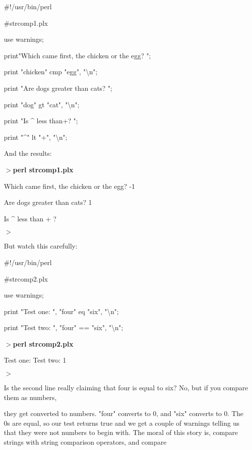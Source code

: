\documentclass[a4paper,11pt]{book}
\begin{document}
\noindent 

\noindent 

\noindent \#!/usr/bin/perl

\noindent \#strcomp1.plx

\noindent use warnings;

\noindent print"Which came first, the chicken or the egg? ";

\noindent print "chicken" cmp "egg", "\textbackslash n";

\noindent print "Are dogs greater than cats? ";

\noindent print "dog" gt "cat", "\textbackslash n";

\noindent print "Is \^{} less than+? ";

\noindent print "\^{}" lt "+", "\textbackslash n";

\noindent 

\noindent And the results:

\noindent 

\noindent $>$\textbf{perl strcomp1.plx}

\noindent Which came first, the chicken or the egg? -1

\noindent Are dogs greater than cats? 1

\noindent Is \^{} less than + ?

\noindent $>$

\noindent 

\noindent But watch this carefully:

\noindent 

\noindent 

\noindent \#!/usr/bin/perl

\noindent \#strcomp2.plx

\noindent use warnings;

\noindent print "Test one: ", "four" eq "six", "\textbackslash n";

\noindent print "Test two: ", "four" == "six", "\textbackslash n";

\noindent 

\noindent $>$\textbf{perl strcomp2.plx}

\noindent Test one: Test two: 1

\noindent $>$

\noindent 

\noindent 

\noindent Is the second line really claiming that four is equal to six? No, but if you compare them as numbers,

\noindent they get converted to numbers. "four" converts to 0, and "six" converts to 0. The 0s are equal, so our test returns true and we get a couple of warnings telling us that they were not numbers to begin with. The moral of this story is, compare strings with string comparison operators, and compare
\end{document}
